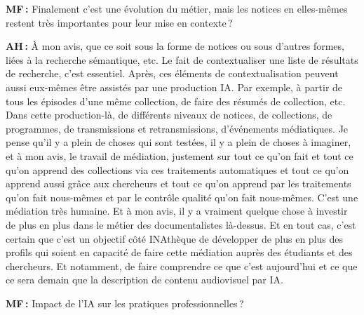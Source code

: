\textbf{MF :} Finalement c'est une évolution du métier, mais les notices en elles-mêmes restent très importantes pour leur mise en contexte ?  

\textbf{AH :} À mon avis, que ce soit sous la forme de notices ou sous d'autres formes, liées à la recherche sémantique, etc. Le fait de contextualiser une liste de résultats de recherche, c'est essentiel.  Après, ces éléments de contextualisation peuvent aussi eux-mêmes être assistés par une production IA. Par exemple, à partir de tous les épisodes d'une même collection, de faire des résumés de collection,  etc. Dans cette production-là, de différents niveaux de notices, de collections, de programmes, de transmissions et retransmissions, d’événements médiatiques. Je pense qu'il y a plein de choses qui sont testées, il y a plein de choses à imaginer, et à mon avis, le travail de médiation, justement sur tout ce qu'on fait et tout ce qu'on apprend des collections via ces traitements automatiques et tout ce qu'on apprend aussi grâce aux chercheurs et tout ce qu'on apprend par les traitements qu'on fait nous-mêmes et par le contrôle qualité qu'on fait nous-mêmes. C'est une médiation très humaine. Et à mon avis, il y a vraiment quelque chose à investir de plus en plus dans le métier des documentalistes là-dessus. Et en tout cas, c'est certain que c'est un objectif côté INAthèque de développer de plus en plus des profils qui soient en capacité de faire cette médiation auprès des étudiants et des chercheurs. Et notamment, de faire comprendre ce que c'est aujourd'hui et ce que ce sera demain que la description de contenu audiovisuel par IA. 

\textbf{MF :} Impact de l’IA sur les pratiques professionnelles ? 

